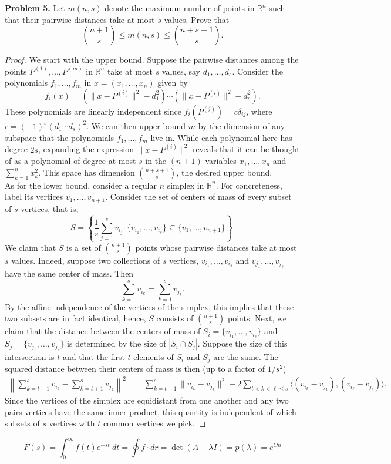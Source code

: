 \documentclass[11pt,letterpaper]{report}
\newcommand{\reals}{\mathbb{R}}
\begin{document}
\noindent\textbf{Problem 5. }
Let $m(n, s)$ denote the maximum number of points in $\reals^n$ such that their pairwise distances take at most $s$ values. Prove that
\[
\binom{n+1}{s} \leq m(n,s) \leq \binom{n+s+1}{s}.
\]
\begin{proof}
  We start with the upper bound.
  Suppose the pairwise distances among the points $P^{(1)}, \ldots, P^{(m)}$ in $\reals^n$ take at most $s$ values, say $d_1, \ldots, d_s$.
  Consider the polynomials $f_1, \ldots, f_m$ in $x = (x_1, \ldots, x_n)$ given by
  \[
  f_i(x) = \left(\|x-P^{(i)}\|^2 - d_1^2\right)\cdots \left(\|x-P^{(i)}\|^2-d_s^2\right).
  \]
  These polynomials are linearly independent since $f_i(P^{(j)}) = c\delta_{ij}$, where $c = (-1)^s(d_1\cdots d_s)^2$.
  We can then upper bound $m$ by the dimension of any subspace that the polynomials $f_1, \ldots, f_m$ live in.
  While each polynomial here has degree $2s$, expanding the expression $\|x-P^{(i)}\|^2$ reveals that it can be thought of as a polynomial of degree at most $s$ in the $(n+1)$ variables $x_1, \ldots, x_n$ and $\sum_{k=1}^nx_k^2$.
  This space has dimension $\binom{n+s+1}{s}$, the desired upper bound.\\

  As for the lower bound, consider a regular $n$ simplex in $\reals^n$.
  For concreteness, label its vertices $v_1, \ldots, v_{n+1}$.
  Consider the set of centers of mass of every subset of $s$ vertices, that is,
  \[
  S = \left\{\frac{1}{s}\sum_{j=1}^sv_{i_j}: \{v_{i_1}, \ldots, v_{i_s}\}\subseteq \{v_1, \ldots, v_{n+1}\}\right\}.
  \]
  We claim that $S$ is a set of $\binom{n+1}{s}$ points whose pairwise distances take at most $s$ values.
  Indeed, suppose two collections of $s$ vertices, $v_{i_1}, \ldots, v_{i_s}$ and $v_{j_1}, \ldots, v_{j_s}$ have the same center of mass.
  Then
  \[
  \sum_{k=1}^sv_{i_k} = \sum_{k=1}^sv_{j_k}.
  \]
  By the affine independence of the vertices of the simplex, this implies that these two subsets are in fact identical, hence, $S$ consists of $\binom{n+1}{s}$ points.
  Next, we claim that the distance between the centers of mass of $S_i = \{v_{i_1}, \ldots, v_{i_s}\}$ and $S_j = \{v_{j_1}, \ldots, v_{j_s}\}$ is determined by the size of $|S_i\cap S_j|$.
  Suppose the size of this intersection is $t$ and that the first $t$ elements of $S_i$ and $S_j$ are the same.
  The squared distance between their centers of mass is then (up to a factor of  $1/s^2$)
  \begin{align*}
    \left\|\sum_{k=t+1}^sv_{i_k} - \sum_{k=t+1}^sv_{j_k}\right\|^2 &= \sum_{k=t+1}^s\|v_{i_k}-v_{j_k}\|^2 + 2\sum_{t<k<\ell\leq s}\langle (v_{i_k} - v_{j_k}), (v_{i_\ell} - v_{j_\ell})\rangle.
  \end{align*}
  Since the vertices of the simplex are equidistant from one another and any two pairs vertices have the same inner product, this quantity is independent of which subsets of $s$ vertices with $t$ common vertices we pick.
\end{proof}

\[
  F(s) = \int_0^\infty f(t)e^{-st}\ dt = \oint f\cdot dr = \det(A-\lambda I) = p(\lambda) = e^{\Theta n}
\]
\end{document}
